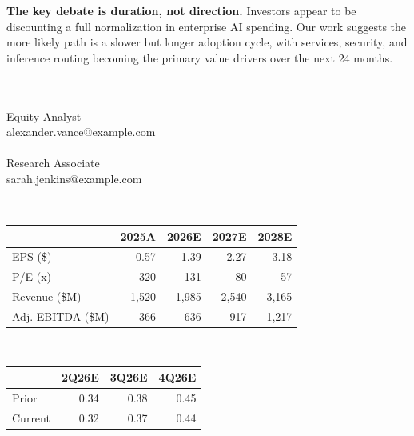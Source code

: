 \documentclass[theme=institutional-research,publication-type=equity-research]{reportkit}
\begin{document}
\begin{researchfrontpage}
\begin{researchmain}
\textbf{The key debate is duration, not direction.} Investors appear to be discounting a full normalization in enterprise AI spending. Our work suggests the more likely path is a slower but longer adoption cycle, with services, security, and inference routing becoming the primary value drivers over the next 24 months.
\end{researchmain}\begin{researchsidebar}
\begin{analystblock}
\\
\\
\textcolor{Muted}{Equity Analyst}\\
alexander.vance@example.com\\[5pt]
\\
\textcolor{Muted}{Research Associate}\\
sarah.jenkins@example.com
\end{analystblock}

\begin{marketdatablock}
\par\vspace{2pt}
\end{marketdatablock}

\begin{estimatesblock}
\\[2pt]
\begin{tabularx}{\linewidth}{@{}Yrrrr@{}}
& \textbf{2025A} & \textbf{2026E} & \textbf{2027E} & \textbf{2028E}\\
\midrule
EPS (\$) & 0.57 & 1.39 & 2.27 & 3.18\\
P/E (x) & 320 & 131 & 80 & 57\\
Revenue (\$M) & 1,520 & 1,985 & 2,540 & 3,165\\
Adj. EBITDA (\$M) & 366 & 636 & 917 & 1,217\\
\end{tabularx}
\end{estimatesblock}

\begin{estimatesblock}
\\[2pt]
\begin{tabularx}{\linewidth}{@{}Yrrr@{}}
& \textbf{2Q26E} & \textbf{3Q26E} & \textbf{4Q26E}\\
\midrule
Prior & 0.34 & 0.38 & 0.45\\
Current & 0.32 & 0.37 & 0.44\\
\end{tabularx}
\vspace{2pt}
\end{estimatesblock}


\end{researchsidebar}
\end{researchfrontpage}
\end{document}
